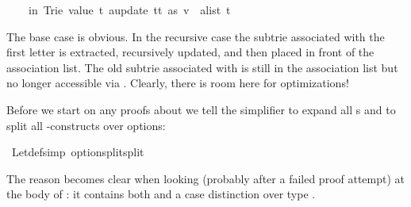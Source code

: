 \begin{isabellebody}
\ \ \ \ in\ Trie\ {}value\ t{}\ {}{}a{}update\ tt\ as\ v{}\ {}\ alist\ t{}{}{}%
\begin{isamarkuptext}%
\noindent
The base case is obvious. In the recursive case the subtrie
 associated with the first letter  is extracted,
recursively updated, and then placed in front of the association list.
The old subtrie associated with  is still in the association list
but no longer accessible via . Clearly, there is room here for
optimizations!

Before we start on any proofs about  we tell the simplifier to
expand all s and to split all -constructs over
options:%
\end{isamarkuptext}%
\isamarkuptrue%
\isamarkupfalse%
\ Let{}def{}simp{}\ option{}split{}split{}%
\begin{isamarkuptext}%
\noindent
The reason becomes clear when looking (probably after a failed proof
attempt) at the body of : it contains both
 and a case distinction over type .


\end{isamarkuptext}
\end{isabellebody}
